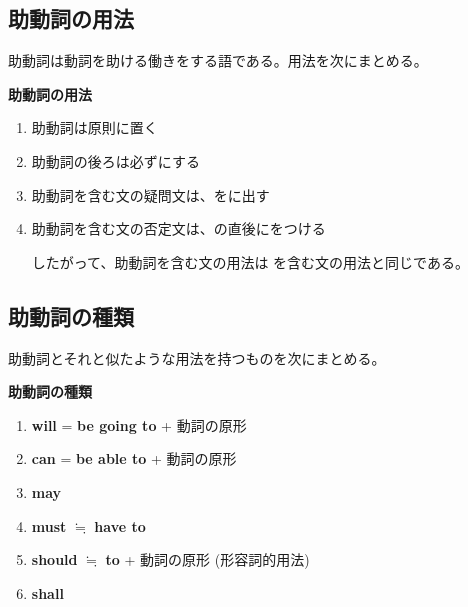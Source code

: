\subsection{助動詞の用法}
    助動詞は動詞を助ける働きをする語である。用法を次にまとめる。

    \begin{theorembox}{\textbf{助動詞の用法}}
        \begin{enumerate}
            \item 助動詞は原則に置く
            \item 助動詞の後ろは必ずにする
            \item 助動詞を含む文の疑問文は、をに出す
            \item 助動詞を含む文の否定文は、の直後にをつける

            したがって、助動詞を含む文の用法は を含む文の用法と同じである。
        \end{enumerate}
    \end{theorembox}
    \vspace{1em}

\subsection{助動詞の種類}
    助動詞とそれと似たような用法を持つものを次にまとめる。

    \begin{definitionbox}{\textbf{助動詞の種類}}
        \begin{enumerate}
            \item \textbf{will} = \textbf{be going to} + 動詞の原形
            \item \textbf{can} = \textbf{be able to} + 動詞の原形
            \item \textbf{may}
            \item \textbf{must} $\fallingdotseq$ \textbf{have to}
            \item \textbf{should} $\fallingdotseq$ \textbf{to} + 動詞の原形 (形容詞的用法)
            \item \textbf{shall}
        \end{enumerate}
    \end{definitionbox}

